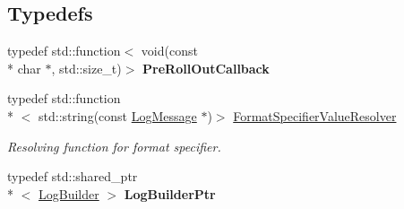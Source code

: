 \subsection*{Typedefs}
\begin{DoxyCompactItemize}
\item 
\hypertarget{namespaceel_aeb764b890a6f3cd41d2726bcd4e9c0cf}{typedef std\-::function$<$ void(const \\*
char $\ast$, std\-::size\-\_\-t)$>$ {\bfseries Pre\-Roll\-Out\-Callback}}\label{namespaceel_aeb764b890a6f3cd41d2726bcd4e9c0cf}

\item 
\hypertarget{namespaceel_a7127f2de2769e2a199a3665f42028a16}{typedef std\-::function\\*
$<$ std\-::string(const \hyperlink{classel_1_1LogMessage}{Log\-Message} $\ast$)$>$ \hyperlink{namespaceel_a7127f2de2769e2a199a3665f42028a16}{Format\-Specifier\-Value\-Resolver}}\label{namespaceel_a7127f2de2769e2a199a3665f42028a16}

\begin{DoxyCompactList}\small\item\em Resolving function for format specifier. \end{DoxyCompactList}\item 
\hypertarget{namespaceel_ad4c4b2f7d70a4b02568a9f70724a6b39}{typedef std\-::shared\-\_\-ptr\\*
$<$ \hyperlink{classel_1_1LogBuilder}{Log\-Builder} $>$ {\bfseries Log\-Builder\-Ptr}}\label{namespaceel_ad4c4b2f7d70a4b02568a9f70724a6b39}

\end{DoxyCompactItemize}
